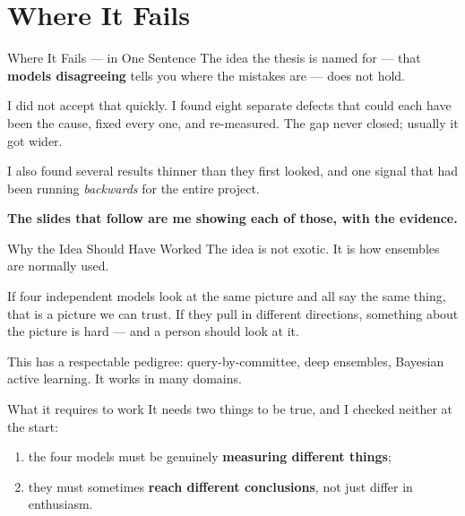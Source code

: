 \documentclass[aspectratio=169,11pt]{beamer}
\begin{document}
\section{Where It Fails}

\begin{frame}{Where It Fails --- in One Sentence}
\large
The idea the thesis is named for --- that \textbf{models disagreeing} tells you where the mistakes are --- does not hold.
\vspace{4mm}

\normalsize I did not accept that quickly. I found eight separate defects that could each have been the cause, fixed every one, and re-measured. The gap never closed; usually it got wider.
\vspace{4mm}

I also found several results thinner than they first looked, and one signal that had been running \emph{backwards} for the entire project.
\vspace{4mm}

\textbf{The slides that follow are me showing each of those, with the evidence.}
\end{frame}


\begin{frame}{Why the Idea Should Have Worked}
\small
The idea is not exotic. It is how ensembles are normally used.
\vspace{1.5mm}

\small
If four independent models look at the same picture and all say the same thing, that is a picture we can trust. If they pull in different directions, something about the picture is hard --- and a person should look at it.
\vspace{2mm}

This has a respectable pedigree: query-by-committee, deep ensembles, Bayesian active learning. It works in many domains.
\vspace{2mm}

\begin{block}{\small What it requires to work}
It needs two things to be true, and I checked neither at the start:
\vspace{2mm}
\begin{enumerate}
  \item the four models must be genuinely \textbf{measuring different things};
  \item they must sometimes \textbf{reach different conclusions}, not just differ in enthusiasm.
\end{enumerate}
\end{block}
\end{frame}
\end{document}

